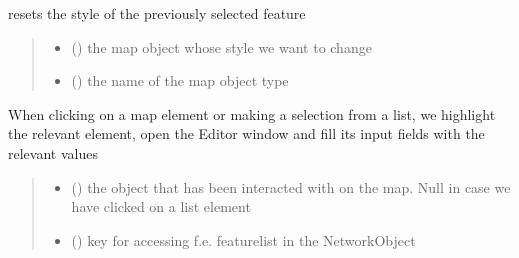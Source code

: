 \documentclass[letterpaper,10pt,english]{sphinxmanual}
\begin{document}
\begin{fulllineitems}
\label{\detokenize{docs_gui/js_api/urbs_results/setup_urbs_results:resetUrbsStyle}}
\pysigstartsignatures
{}
\pysigstopsignatures
\sphinxAtStartPar
resets the style of the previously selected feature
\begin{quote}\begin{description}
\begin{itemize}
\item {} 
\sphinxAtStartPar
{} () \textendash{} the map object whose style we want to change

\item {} 
\sphinxAtStartPar
{} () \textendash{} the name of the map object type

\end{itemize}

\end{description}\end{quote}

\end{fulllineitems}


\begin{fulllineitems}
\label{\detokenize{docs_gui/js_api/urbs_results/setup_urbs_results:clickOnUrbsMarker}}
\pysigstartsignatures
{}
\pysigstopsignatures
\sphinxAtStartPar
When clicking on a map element or making a selection from a list,
we highlight the relevant element, open the Editor window and fill its input fields with the relevant values
\begin{quote}\begin{description}
\begin{itemize}
\item {} 
\sphinxAtStartPar
{} () \textendash{} the object that has been interacted with on the map. Null in case we have clicked on a list element

\item {} 
\sphinxAtStartPar
{} () \textendash{} key for accessing f.e. featurelist in the NetworkObject

\end{itemize}

\end{description}\end{quote}

\end{fulllineitems}
\end{document}
